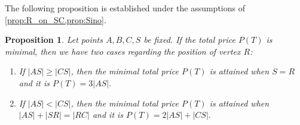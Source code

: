 \documentclass[openany]{book}
\newcommand{\Ptotal}[1]{P(#1)}
\newtheorem{proposition}{Proposition}
\begin{document}
	The following proposition is established under the assumptions of \cref{prop:R_on_SC,prop:Sino}.
	\begin{proposition}\label{PbasedonR}
		Let points \(A,B,C,S\) be fixed. If the total price \(\Ptotal{T}\) is minimal, then we have two cases regarding the position of vertex \(R\):
		\begin{enumerate}
			\item If \(|AS| \geq |CS|\), then the minimal total price \(\Ptotal{T}\) is attained when \(S = R\) and it is \(\Ptotal{T} = 3|AS|.\)
			\item If \(|AS| < |CS|\), then the minimal total price \(\Ptotal{T}\) is attained when \(|AS| + |SR| = |RC|\) and it is \(\Ptotal{T} = 2|AS| + |CS|.\)
		\end{enumerate}
	\end{proposition}
\end{document}
